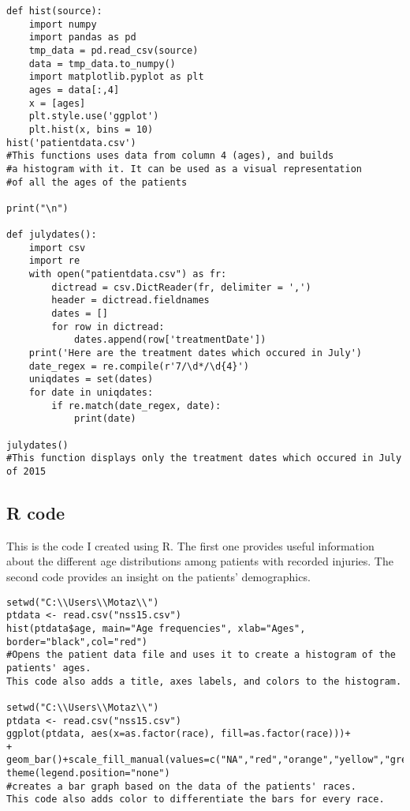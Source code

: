 \documentclass{article}
\begin{document}
\begin{verbatim}
def hist(source):
    import numpy
    import pandas as pd
    tmp_data = pd.read_csv(source)
    data = tmp_data.to_numpy()
    import matplotlib.pyplot as plt
    ages = data[:,4]
    x = [ages]
    plt.style.use('ggplot')
    plt.hist(x, bins = 10)
hist('patientdata.csv')
#This functions uses data from column 4 (ages), and builds
#a histogram with it. It can be used as a visual representation
#of all the ages of the patients

print("\n")

def julydates():
    import csv
    import re
    with open("patientdata.csv") as fr:
        dictread = csv.DictReader(fr, delimiter = ',')
        header = dictread.fieldnames
        dates = []
        for row in dictread:
            dates.append(row['treatmentDate'])
    print('Here are the treatment dates which occured in July')
    date_regex = re.compile(r'7/\d*/\d{4}')
    uniqdates = set(dates)
    for date in uniqdates:
        if re.match(date_regex, date):
            print(date)

julydates()
#This function displays only the treatment dates which occured in July of 2015

\end{verbatim}

\subsection{R code}
This is the code I created using R. The first one provides useful information about the different age distributions among patients with recorded injuries. The second code provides an insight on the patients' demographics.

\begin{verbatim}
setwd("C:\\Users\\Motaz\\")
ptdata <- read.csv("nss15.csv")
hist(ptdata$age, main="Age frequencies", xlab="Ages", border="black",col="red")
#Opens the patient data file and uses it to create a histogram of the patients' ages.
This code also adds a title, axes labels, and colors to the histogram.

setwd("C:\\Users\\Motaz\\")
ptdata <- read.csv("nss15.csv")
ggplot(ptdata, aes(x=as.factor(race), fill=as.factor(race)))+
+ geom_bar()+scale_fill_manual(values=c("NA","red","orange","yellow","green","blue"))+
theme(legend.position="none")
#creates a bar graph based on the data of the patients' races.
This code also adds color to differentiate the bars for every race.
\end{verbatim}
\end{document}
